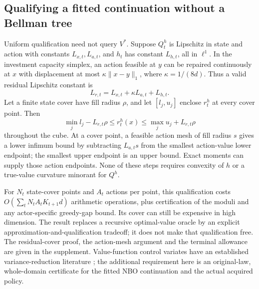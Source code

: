 \subsection{Qualifying a fitted continuation without a Bellman tree}
Uniform qualification need not query $V^*$. Suppose $Q_t^h$ is Lipschitz in state and action with constants $L_{x,t},L_{a,t}$, and $h_t$ has constant $L_{h,t}$, all in $\ell^1$. In the investment capacity simplex, an action feasible at $y$ can be repaired continuously at $x$ with displacement at most $\kappa\|x-y\|_1$, where $\kappa=1/(8d)$. Thus a valid residual Lipschitz constant is
\[
 L_{r,t}=L_{x,t}+\kappa L_{a,t}+L_{h,t}.
\]
Let a finite state cover have fill radius $\rho$, and let $[l_j,u_j]$ enclose $r_t^h$ at every cover point. Then
\begin{equation}\label{eq:residual-cover72}
 \min_jl_j-L_{r,t}\rho\le r_t^h(x)
       \le\max_ju_j+L_{r,t}\rho
\end{equation}
throughout the cube. At a cover point, a feasible action mesh of fill radius $s$ gives a lower infimum bound by subtracting $L_{a,t}s$ from the smallest action-value lower endpoint; the smallest upper endpoint is an upper bound. Exact moments can supply those action endpoints. None of these steps requires convexity of $h$ or a true-value curvature minorant for $Q^h$.

For $N_t$ state-cover points and $A_t$ actions per point, this qualification costs $O(\sum_tN_tA_tK_{t+1}d)$ arithmetic operations, plus certification of the moduli and any actor-specific greedy-gap bound. Its cover can still be expensive in high dimension. The result replaces a recursive optimal-value oracle by an explicit approximation-and-qualification tradeoff; it does not make that qualification free. The residual-cover proof, the action-mesh argument and the terminal allowance are given in the supplement. Value-function control variates have an established variance-reduction literature \citep{munos2006variance}; the additional requirement here is an original-law, whole-domain certificate for the fitted NBO continuation and the actual acquired policy.
